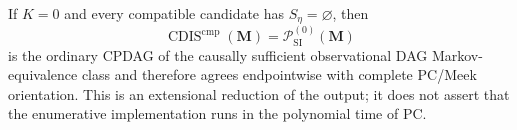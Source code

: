If \(K=0\) and every compatible candidate has \(S_\eta=\varnothing\), then
\[
\operatorname{CDIS}^{\mathrm{cmp}}(\mathbf M)
=\mathcal P_{\mathrm{SI}}^{(0)}(\mathbf M)
\]
is the ordinary CPDAG of the causally sufficient observational DAG Markov-equivalence class and therefore agrees endpointwise with complete PC/Meek orientation.  This is an extensional reduction of the output; it does not assert that the enumerative implementation runs in the polynomial time of PC.